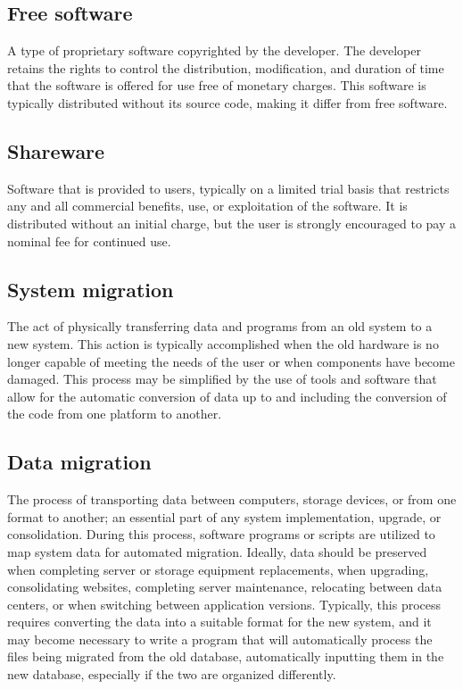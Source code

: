       \subsection*{Free software}
    A type of proprietary software copyrighted by the developer. The developer retains the rights to control the distribution, modification, and duration of time that the software is offered for use free of monetary charges. This software is typically distributed without its source code, making it differ from free software. 
  \subsection*{Shareware}
  Software that is provided to users, typically on a limited trial basis that restricts any and all commercial benefits, use, or exploitation of the software. It is distributed without an initial charge, but the user is strongly encouraged to pay a nominal fee for continued use.   

   \subsection*{System migration}   
The act of physically transferring data and programs from an old system to a new system. This action is typically accomplished when the old hardware is no longer capable of meeting the needs of the user or when components have become damaged. This process may be simplified by the use of tools and software that allow for the automatic conversion of data up to and including the conversion of the code from one platform to another. 
   \subsection*{Data migration}
   The process of transporting data between computers, storage devices, or from one format to another; an essential part of any system implementation, upgrade, or consolidation. During this process, software programs or scripts are utilized to map system data for automated migration. Ideally, data should be preserved when completing server or storage equipment replacements, when upgrading, consolidating websites, completing server maintenance, relocating between data centers, or when switching between application versions. Typically, this process requires converting the data into a suitable format for the new system, and it may become necessary to write a program that will automatically process the files being migrated from the old database, automatically inputting them in the new database, especially if the two are organized differently. 

